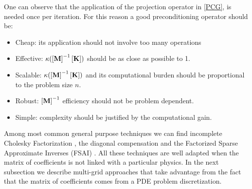 One can observe that the application of the projection operator in \ref{PCG}, is needed once per iteration. For this reason a good preconditioning operator should be:
\begin{itemize}
\item Cheap: its application should not involve too many operations
\item Effective: $\kappa(\left[{\mathbf{M}}\right]^{-1}\left[{\mathbf{K}}\right])$ should be as close as possible to 1.
\item Scalable:  $\kappa(\left[{\mathbf{M}}\right]^{-1}\left[{\mathbf{K}}\right])$ and its computational burden should be proportional to the problem size $n$.
\item Robust:  $\left[{\mathbf{M}}\right]^{-1}$ efficiency should not be problem dependent.
\item Simple:  complexity should be justified by the computational gain.
\end{itemize}
Among most common general purpose techniques we can find incomplete Cholesky Factorization \cite{kershaw1978incomplete}, the diagonal compensation \cite{jacobi1845ueber} and the Factorized Sparse Approximate Inverses (FSAI) \cite{buleev1960numerical,buleev1960numerical2,meijerink1977iterative,il1992iterative,varga1960boundary}. All these techniques are well adapted when the matrix of coefficients is not linked with a particular physics. In the next subsection we describe multi-grid approaches that take advantage from the fact that the matrix of coefficients comes from a PDE problem discretization.

